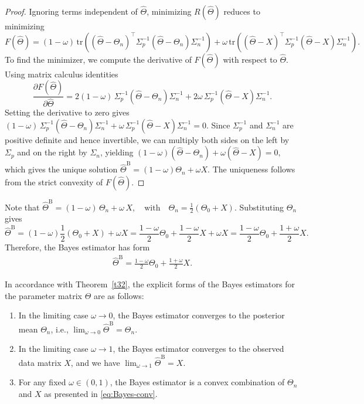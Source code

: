 \documentclass[twoside]{article}
\begin{document}
\begin{proof}
Ignoring terms independent of $\hat{\Theta}$, minimizing $R(\hat{\Theta})$ reduces to minimizing
\[
F(\hat{\Theta}) = (1-\omega) \, \mathrm{tr}\left((\hat{\Theta} - \Theta_n)^\top \Sigma_p^{-1} (\hat{\Theta} - \Theta_n) \Sigma_n^{-1}\right) + \omega \, \mathrm{tr}\left((\hat{\Theta} - X)^\top \Sigma_p^{-1} (\hat{\Theta} - X) \Sigma_n^{-1}\right).
\]
To find the minimizer, we compute the derivative of $F(\hat{\Theta})$ with respect to $\hat{\Theta}$. Using matrix calculus identities
\[
\frac{\partial F(\hat{\Theta})}{\partial \hat{\Theta}} = 2(1-\omega) \, \Sigma_p^{-1} (\hat{\Theta} - \Theta_n) \Sigma_n^{-1} + 2\omega \, \Sigma_p^{-1} (\hat{\Theta} - X) \Sigma_n^{-1}.
\]
Setting the derivative to zero gives $(1-\omega) \, \Sigma_p^{-1} (\hat{\Theta} - \Theta_n) \Sigma_n^{-1} + \omega \, \Sigma_p^{-1} (\hat{\Theta} - X) \Sigma_n^{-1} = 0$. Since $\Sigma_p^{-1}$ and $\Sigma_n^{-1}$ are positive definite and hence invertible, we can multiply both sides on the left by $\Sigma_p$ and on the right by $\Sigma_n$, yielding 
$
(1-\omega)(\hat{\Theta} - \Theta_n) + \omega (\hat{\Theta} - X) = 0,
$
which gives the unique solution $\hat{\Theta}^{\mathrm{B}} = (1-\omega) \Theta_n + \omega X$. The uniqueness follows from the strict convexity of $F(\hat{\Theta})$.
\end{proof}
Note that $\hat{\Theta}^{\mathrm{B}} = (1-\omega) \, \Theta_n + \omega \, X, \quad \text{with} \quad \Theta_n = \frac{1}{2} (\Theta_0 + X)$. Substituting $\Theta_n$ gives
\[
\hat{\Theta}^{\mathrm{B}} = (1-\omega) \frac{1}{2} (\Theta_0 + X) + \omega X
= \frac{1-\omega}{2} \Theta_0 + \frac{1-\omega}{2} X + \omega X
= \frac{1-\omega}{2} \Theta_0 + \frac{1+\omega}{2} X.
\]
Therefore, the Bayes estimator has form
\begin{eqnarray}\label{eq:Bayes-conv}
\hat{\Theta}^{\mathrm{B}} = \frac{1-\omega}{2} \Theta_0 + \frac{1+\omega}{2} X.	
\end{eqnarray}

\begin{cor}
In accordance with Theorem~\ref{t32}, the explicit forms of the Bayes estimators for the parameter matrix $\Theta$ are as follows:
\begin{enumerate}
    \item In the limiting case $\omega \to 0$, the Bayes estimator converges to the posterior mean $\Theta_n$, i.e., $\lim_{\omega \to 0} \hat{\Theta}^{\mathrm{B}} = \Theta_n$.
    \item In the limiting case $\omega \to 1$, the Bayes estimator converges to the observed data matrix $X$, and we have $\lim_{\omega \to 1} \hat{\Theta}^{\mathrm{B}} = X$.
    \item For any fixed $\omega \in (0,1)$, the Bayes estimator is a convex combination of $\Theta_n$ and $X$ as presented in \eqref{eq:Bayes-conv}.
\end{enumerate}
\end{cor}
\end{document}
